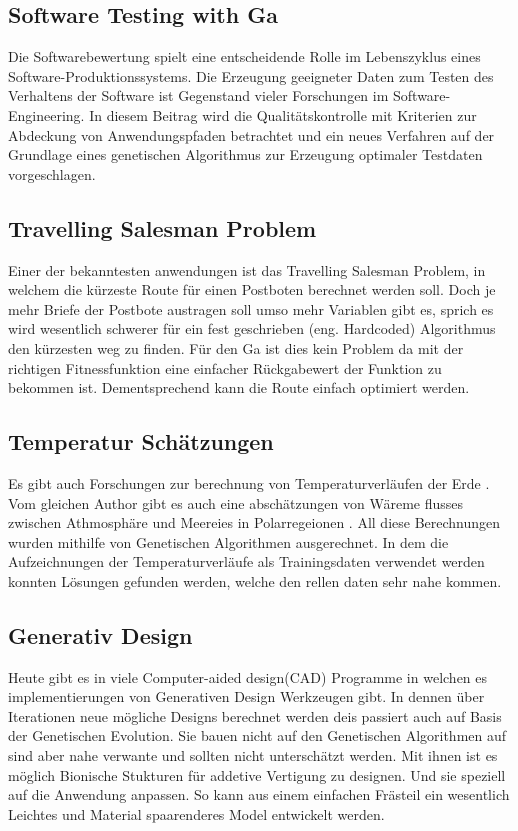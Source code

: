 \subsection{Software Testing with Ga}
Die Softwarebewertung spielt eine entscheidende Rolle im Lebenszyklus eines Software-Produktionssystems. Die Erzeugung geeigneter Daten zum Testen des Verhaltens der Software ist Gegenstand vieler Forschungen im Software-Engineering.  In diesem Beitrag wird die Qualitätskontrolle mit Kriterien zur Abdeckung von Anwendungspfaden betrachtet und ein neues Verfahren auf der Grundlage eines genetischen Algorithmus zur Erzeugung optimaler Testdaten vorgeschlagen. 
\cite{Keshavarz}


\subsection{Travelling Salesman Problem}
Einer der bekanntesten anwendungen ist das Travelling Salesman Problem, in welchem die kürzeste Route für einen Postboten berechnet werden soll. Doch je mehr Briefe der Postbote austragen soll umso mehr Variablen gibt es, sprich es wird wesentlich schwerer für ein fest geschrieben (eng. Hardcoded) Algorithmus den kürzesten weg zu finden. Für den Ga ist dies kein Problem da mit der richtigen Fitnessfunktion eine einfacher Rückgabewert der Funktion zu bekommen ist. Dementsprechend kann die Route einfach optimiert werden.

\subsection{Temperatur Schätzungen}
Es gibt auch Forschungen zur berechnung von Temperaturverläufen der Erde \cite{Stanislawska1}. Vom gleichen Author gibt es auch eine abschätzungen von Wäreme flusses zwischen Athmosphäre und Meereies in Polarregeionen \cite{Stanislawska2}. All diese Berechnungen wurden mithilfe von Genetischen Algorithmen ausgerechnet. In dem die Aufzeichnungen der Temperaturverläufe als Trainingsdaten verwendet werden konnten Lösungen gefunden werden, welche den rellen daten sehr nahe kommen.

\subsection{Generativ Design}
Heute gibt es in viele Computer-aided design(CAD) Programme in welchen es implementierungen von Generativen Design Werkzeugen gibt. In dennen über Iterationen neue mögliche Designs berechnet werden deis passiert auch auf Basis der Genetischen Evolution. Sie bauen nicht auf den Genetischen Algorithmen auf sind aber nahe verwante und sollten nicht unterschätzt werden. 
Mit ihnen ist es möglich Bionische Stukturen für addetive Vertigung zu designen. Und sie speziell auf die Anwendung anpassen. So kann aus einem einfachen Frästeil ein wesentlich Leichtes und Material spaarenderes Model entwickelt werden.


